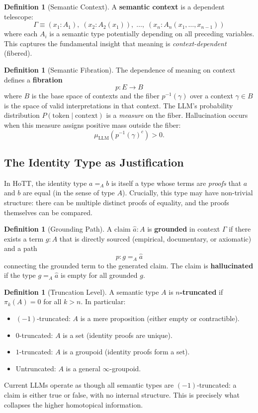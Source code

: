 \documentclass[11pt,a4paper,twocolumn]{article}
\theoremstyle{plain}
\theoremstyle{definition}
\newtheorem{definition}[theorem]{Definition}
\begin{document}
\begin{definition}[Semantic Context]\label{def:ctx}
A \textbf{semantic context} is a dependent telescope:
\[
  \Gamma \equiv (x_1 : A_1),\; (x_2 : A_2(x_1)),\; \ldots,\; (x_n : A_n(x_1, \ldots, x_{n-1}))
\]
where each $A_i$ is a semantic type potentially depending on all preceding variables. This captures the fundamental insight that meaning is \emph{context-dependent} (fibered).
\end{definition}

\begin{definition}[Semantic Fibration]\label{def:fibration}
The dependence of meaning on context defines a \textbf{fibration}
\[
  p\colon E \to B
\]
where $B$ is the base space of contexts and the fiber $p^{-1}(\gamma)$ over a context $\gamma \in B$ is the space of valid interpretations in that context. The LLM's probability distribution $P(\text{token} \mid \text{context})$ is a \emph{measure} on the fiber. Hallucination occurs when this measure assigns positive mass outside the fiber:
\[
  \mu_{\text{LLM}}(p^{-1}(\gamma)^c) > 0.
\]
\end{definition}

\subsection{The Identity Type as Justification}

In HoTT, the identity type $a =_A b$ is itself a type whose terms are \emph{proofs} that $a$ and $b$ are equal (in the sense of type $A$). Crucially, this type may have non-trivial structure: there can be multiple distinct proofs of equality, and the proofs themselves can be compared.

\begin{definition}[Grounding Path]\label{def:grounding}
A claim $\hat{a} : A$ is \textbf{grounded} in context $\Gamma$ if there exists a term $g : A$ that is directly sourced (empirical, documentary, or axiomatic) and a path
\[
  p : g =_A \hat{a}
\]
connecting the grounded term to the generated claim. The claim is \textbf{hallucinated} if the type $g =_A \hat{a}$ is empty for all grounded $g$.
\end{definition}

\begin{definition}[Truncation Level]\label{def:truncation}
A semantic type $A$ is \textbf{$n$-truncated} if $\pi_k(A) = 0$ for all $k > n$. In particular:
\begin{itemize}[nosep]
  \item $(-1)$-truncated: $A$ is a mere proposition (either empty or contractible).
  \item $0$-truncated: $A$ is a set (identity proofs are unique).
  \item $1$-truncated: $A$ is a groupoid (identity proofs form a set).
  \item Untruncated: $A$ is a general $\infty$-groupoid.
\end{itemize}
Current LLMs operate as though all semantic types are $(-1)$-truncated: a claim is either true or false, with no internal structure. This is precisely what collapses the higher homotopical information.
\end{definition}
\end{document}

